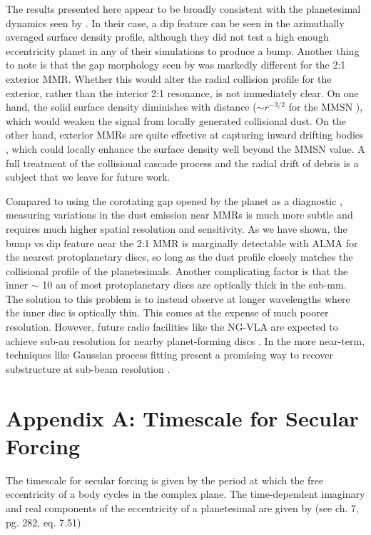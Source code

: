 The results presented here appear to be broadly consistent with the planetesimal dynamics seen by \cite{tabeshian16}. In their 
case, a dip feature can be seen in the azimuthally averaged surface density profile, although they did not test a high enough 
eccentricity planet in any of their simulations to produce a bump. Another thing to note is that the gap morphology seen by 
\cite{tabeshian16} was markedly different for the 2:1 exterior MMR. Whether this would alter the radial collision profile for the 
exterior, rather than the interior 2:1 resonance, is not immediately clear.  On one hand, the solid surface density diminishes with 
distance ($\sim r^{-3/2}$ for the MMSN \cite{hayashi81}), which would weaken the signal from locally generated collisional dust. 
On the other hand, exterior MMRs are quite effective at capturing inward drifting bodies \cite{weidenschilling85}, which could 
locally enhance the surface density well beyond the MMSN value. A full treatment of the collisional cascade process and the 
radial drift of debris is a subject that we leave for future work.

Compared to using the corotating gap opened by the planet as a diagnostic \cite{dobinson13, dobinson16}, measuring variations 
in the dust emission near MMRs is much more subtle and requires much higher spatial resolution and sensitivity. As we have 
shown, the bump vs dip feature near the 2:1 MMR is marginally detectable with ALMA for the nearest protoplanetary discs, so 
long as the dust profile closely matches the collisional profile of the planetesimals. Another complicating factor is that the inner $
\sim$ 10 au of most protoplanetary discs are optically thick in the sub-mm. The solution to this problem is to instead observe at 
longer wavelengths where the inner disc is optically thin. This comes at the expense of much poorer resolution. However, future 
radio facilities like the NG-VLA are expected to achieve sub-au resolution for nearby planet-forming discs \cite{ricci20}. In the 
more near-term, techniques like Gaussian process fitting present a promising way to recover substructure at sub-beam 
resolution \cite{jennings20}.

\section{Appendix A: Timescale for Secular Forcing}\label{sec:sec_forcing_timescale}

The timescale for secular forcing is given by the period at which the free eccentricity of a body cycles in the complex plane. The 
time-dependent imaginary and real components of the eccentricity of a planetesimal are given by \cite{murray99} (see ch. 7, pg. 
282, eq. 7.51)

